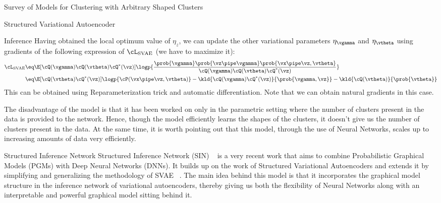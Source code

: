 \documentclass{article}
\begin{document}
\begin{psection}{Survey of Models for Clustering with Arbitrary Shaped Clusters}
\begin{psubsection}{Structured Variational Autoencoder}
\begin{pssubsection}{Inference}
			Having obtained the local optimum value of $\eta_z$, we can update the other variational parameters $\eta_\vgamma$ and $\eta_\vtheta$ using gradients of the following expression of $\cL_{\text{SVAE}}$ (we have to maximize it):
			\begin{align*}
				\cL_{\text{SVAE}} &\eq	\E[\cQ(\vgamma) \cQ(\vtheta) \cQ^{*}(\vz)]{\logp{\frac{\prob{\vgamma} \prob{\vz \pipe \vgamma} \prob{\vx \pipe \vz, \vtheta}}{\cQ(\vgamma) \cQ(\vtheta) \cQ^{*}(\vz)}}} \\
				&\eq 					\E[\cQ(\vtheta) \cQ^{*}(\vz)]{\logp{\cP(\vx \pipe \vz, \vtheta)}} - \kld{\cQ(\vgamma) \cQ^{*}(\vz)}{\prob{\vgamma, \vz}} - \kld{\cQ(\vtheta)}{\prob{\vtheta}}
			\end{align*}
			This can be obtained using Reparameterization trick and automatic differentiation. Note that we can obtain natural gradients in this case.

			The disadvantage of the model is that it has been worked on only in the parametric setting where the number of clusters present in the data is provided to the network. Hence, though the model efficiently learns the shapes of the clusters, it doesn't give us the number of clusters present in the data. At the same time, it is worth pointing out that this model, through the use of Neural Networks, scales up to increasing amounts of data very efficiently.

		\end{pssubsection}

	\end{psubsection}

	\begin{psubsection}{Structured Inference Network}
		Structured Inference Network (SIN) ~\citep{lin2018variational} is a very recent work that aims to combine Probabilistic Graphical Models (PGMs) with Deep Neural Networks (DNNs). It builds up on the work of Structured Variational Autoencoders and extends it by simplifying and generalizing the methodology of SVAE ~\citep{svae}. The main idea behind this model is that it incorporates the graphical model structure in the inference network of variational autoencoders, thereby giving us both the flexibility of Neural Networks along with an interpretable and powerful graphical model sitting behind it. 


\end{psubsection}
\end{psection}
\end{document}

